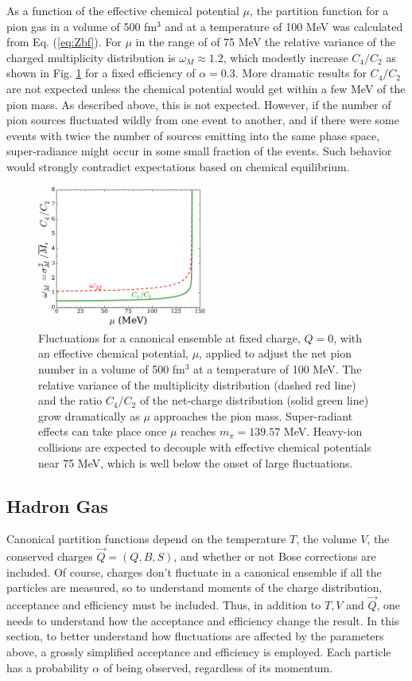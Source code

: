 \documentclass[aps,prc,nofootinbib,showpacs,superscriptaddress,groupedaddress]{revtex4-1}
\begin{document}
As a function of the effective chemical potential $\mu$, the partition function for a pion gas in a volume of 500 fm$^3$ and at a temperature of 100 MeV was calculated from Eq. (\ref{eq:Zbf}). For $\mu$ in the range of of 75 MeV the relative variance of the charged multiplicity distribution is $\omega_M\approx 1.2$, which modestly increase $C_4/C_2$ as shown in Fig. \ref{fig:cheapbose} for a fixed efficiency of $\alpha=0.3$. More dramatic results for $C_4/C_2$ are not expected unless the chemical potential would get within a few MeV of the pion mass. As described above, this is not expected. However, if the number of pion sources fluctuated wildly from one event to another, and if there were some events with twice the number of sources emitting into the same phase space, super-radiance might occur in some small fraction of the events. Such behavior would strongly contradict expectations based on chemical equilibrium. 
\begin{figure}
\centerline{\includegraphics[width=0.5\textwidth]{figs/C4_bose}}
\caption{\label{fig:cheapbose}
Fluctuations for a canonical ensemble at fixed charge, $Q=0$, with an effective chemical potential, $\mu$, applied to adjust the net pion number in a volume of 500 fm$^3$ at a temperature of 100 MeV. The relative variance of the multiplicity distribution (dashed red line) and the ratio $C_4/C_2$ of the net-charge distribution (solid green line) grow dramatically as $\mu$ approaches the pion mass. Super-radiant effects can take place once $\mu$ reaches $m_\pi=139.57$ MeV. Heavy-ion collisions are expected to decouple with effective chemical potentials near 75 MeV, which is well below the onset of large fluctuations.
}
\end{figure}

\subsection{Hadron Gas}

Canonical partition functions depend on the temperature $T$, the volume $V$, the conserved charges $\vec{Q}=(Q,B,S)$, and whether or not Bose corrections are included. Of course, charges don't fluctuate in a canonical ensemble if all the particles are measured, so to understand moments of the charge distribution, acceptance and efficiency must be included. Thus, in addition to $T,V$ and $\vec{Q}$, one needs to understand how the acceptance and efficiency change the result. In this section, to better understand how fluctuations are affected by the parameters above, a grossly simplified acceptance and efficiency is employed. Each particle has a probability $\alpha$ of being observed, regardless of its momentum. 
\end{document}
